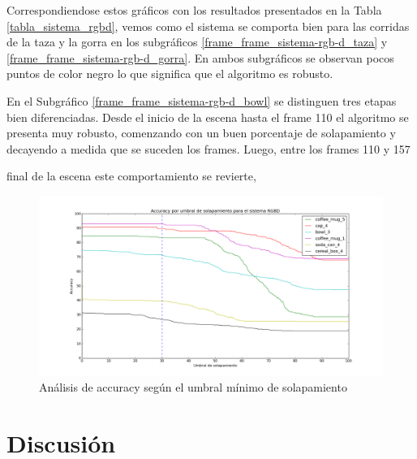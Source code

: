 Correspondiendose estos gráficos con los resultados presentados en la Tabla \ref{tabla_sistema_rgbd}, vemos como el sistema se comporta bien para las corridas de la taza y la gorra en los subgráficos \ref{frame_frame_sistema-rgb-d_taza} y \ref{frame_frame_sistema-rgb-d_gorra}. En ambos subgráficos se observan pocos puntos de color negro lo que significa que el algoritmo es robusto.

En el Subgráfico \ref{frame_frame_sistema-rgb-d_bowl} se distinguen tres etapas bien diferenciadas. Desde el inicio de la escena hasta el frame 110 el algoritmo se presenta muy robusto, comenzando con un buen porcentaje de solapamiento y decayendo a medida que se suceden los frames. Luego, entre los frames 110 y 157 

final de la escena este comportamiento se revierte,


\begin{figure}
	\centering
	\includegraphics[width=\textwidth]{img/accuracy_sistemaRGBD.png}
	\caption{Análisis de accuracy según el umbral mínimo de solapamiento}
	\label{fig:accuracy_sistema}
\end{figure}





\section{Discusión}
